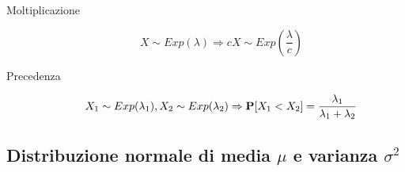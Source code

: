 \begin{description}
	\item [Moltiplicazione]
		\begin{equation}
		X \sim Exp(\lambda) \Rightarrow cX \sim Exp(\frac{\lambda}{c})
	\end{equation}
	
	\item [Precedenza]
		\begin{equation}
		X_{1} \sim Exp(\lambda_{1}),X_{2} \sim Exp(\lambda_{2}) \Rightarrow \mathbf{P}[X_{1} < X_{2}] = \frac{\lambda_{1}}{\lambda_{1} + \lambda_{2}}
		\end{equation}
	
\end{description}


\subsection{Distribuzione normale di media $\mu$ e varianza $\sigma^{2}$}

